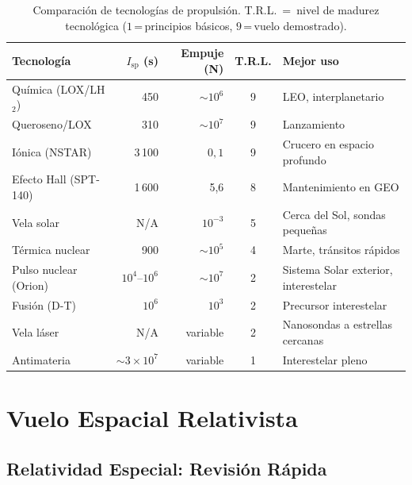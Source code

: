 \documentclass[12pt,a4paper]{article}
\begin{document}
\begin{table}[ht]
  \centering
  \caption{Comparación de tecnologías de propulsión.
           T.R.L.~=~nivel de madurez tecnológica ($1$\,=\,principios básicos,
           $9$\,=\,vuelo demostrado).}
  \label{tab:propulsion_es}
  \begin{tabularx}{\textwidth}{l r r c X}
    \toprule
    Tecnología & $I_{\mathrm{sp}}$ (s) & Empuje (N) & T.R.L. & Mejor uso \\
    \midrule
    Química (LOX/LH$_2$)   & 450            & $\sim\!10^6$ & 9 & LEO, interplanetario \\
    Queroseno/LOX          & 310            & $\sim\!10^7$ & 9 & Lanzamiento \\
    Iónica (NSTAR)         & 3\,100         & $0{,}1$      & 9 & Crucero en espacio profundo \\
    Efecto Hall (SPT-140)  & 1\,600         & 5{,}6        & 8 & Mantenimiento en GEO \\
    Vela solar             & N/A            & $10^{-3}$    & 5 & Cerca del Sol, sondas pequeñas \\
    Térmica nuclear        & 900            & $\sim\!10^5$ & 4 & Marte, tránsitos rápidos \\
    Pulso nuclear (Orion)  & $10^4$--$10^6$ & $\sim\!10^7$ & 2 & Sistema Solar exterior, interestelar \\
    Fusión (D-T)           & $10^6$         & $10^3$       & 2 & Precursor interestelar \\
    Vela láser             & N/A            & variable     & 2 & Nanosondas a estrellas cercanas \\
    Antimateria            & $\sim\!3\!\times\!10^7$ & variable & 1 & Interestelar pleno \\
    \bottomrule
  \end{tabularx}
\end{table}

\section{Vuelo Espacial Relativista}

\subsection{Relatividad Especial: Revisión Rápida}
\end{document}
